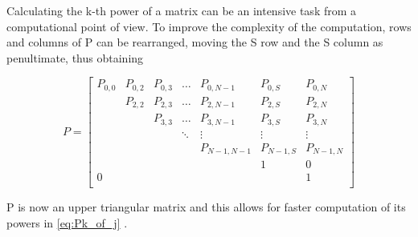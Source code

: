 Calculating the k-th power of a matrix can be an intensive task from a computational point of view. To improve the complexity of the computation, rows and columns of P can be rearranged, moving the S row and the S column as penultimate, thus obtaining

\begin{equation*}
P = 
\begin{bmatrix}
P_{0,0}	& P_{0,2}	& P_{0,3}  	& \dots	& P_{0, N-1}	& P_{0,S}	& P_{0,N} \\
		& P_{2,2}	& P_{2,3}  	& \dots	& P_{2, N-1}	& P_{2,S}	& P_{2,N} \\
		& 			& P_{3,3}	& \dots	& P_{3, N-1}	& P_{3,S}	& P_{3,N} \\
 		& 			& 			& \ddots& \vdots		& \vdots	& \vdots \\
		& 			& 			& 		& P_{N-1,N-1}	& P_{N-1,S}	& P_{N-1, N}\\
		& 			& 			& 		& 				& 1			& 0		 \\
0		& 			& 		  	& 		& 				& 			& 1		 \\
\end{bmatrix}
\label{triangularPMatrix}
\end{equation*}
\hfill \break

P is now an upper triangular matrix and this allows for faster computation of its powers in \ref{eq:Pk_of_j} .


